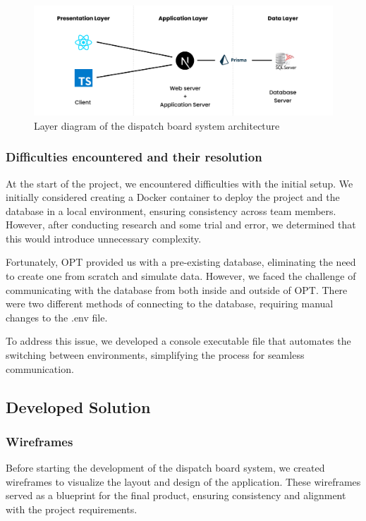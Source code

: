 \documentclass[10pt]{article}
\begin{document}
        \begin{figure}[h]
            \centering
            \includegraphics[width=1\textwidth]{architecture_diagram}
            \caption{Layer diagram of the dispatch board system architecture}
            \label{fig:architecture_diagram}
        \end{figure}

        \subsubsection{Difficulties encountered and their resolution}
        At the start of the project, we encountered difficulties with the initial setup. We initially considered creating a Docker container to deploy the project and the database in a local environment, ensuring consistency across team members. However, after conducting research and some trial and error, we determined that this would introduce unnecessary complexity.

        Fortunately, OPT provided us with a pre-existing database, eliminating the need to create one from scratch and simulate data. However, we faced the challenge of communicating with the database from both inside and outside of OPT. There were two different methods of connecting to the database, requiring manual changes to the .env file.

        To address this issue, we developed a console executable file that automates the switching between environments, simplifying the process for seamless communication.
        \subsection{Developed Solution}

        \subsubsection{Wireframes}
        Before starting the development of the dispatch board system, we created wireframes to visualize the layout and design of the application. These wireframes served as a blueprint for the final product, ensuring consistency and alignment with the project requirements.
\end{document}
